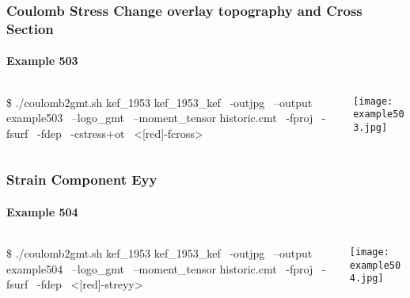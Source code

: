 \begin{frame}[t,fragile]
  \frametitle{Coulomb Stress Change overlay topography and Cross Section}
  \framesubtitle{Example 503}
  \label{ch5fr:ex503}
\begin{columns}[t]
  \begin{column}{.5\textwidth}
\begin{scriptsize}
\begin{verbnobox}[\vbdelim]
\$ ./coulomb2gmt.sh kef_1953 kef_1953_kef \
                   -outjpg \ 
                   --output example503 \
                   --logo_gmt \
                   --moment_tensor historic.cmt \
                   -fproj \
                   -fsurf \
                   -fdep \
                   -cstress+ot \ 
                   <[red]-fcross>
\end{verbnobox}
\end{scriptsize}

  \end{column}
  \begin{column}{.5\textwidth}

\centering
  \texttt{[image: example503.jpg]}
  \end{column}
\end{columns}

\end{frame}
\note{}

\begin{frame}[t,fragile]
  \frametitle{Strain Component Eyy}
  \framesubtitle{Example 504}
  \label{ch5fr:ex504}
\begin{columns}[t]
  \begin{column}{.5\textwidth}
\begin{scriptsize}
\begin{verbnobox}[\vbdelim]
\$ ./coulomb2gmt.sh kef_1953 kef_1953_kef \
                   -outjpg \ 
                   --output example504 \
                   --logo_gmt \
                   --moment_tensor historic.cmt \
                   -fproj \
                   -fsurf \
                   -fdep \
                   <[red]-streyy>
\end{verbnobox}
\end{scriptsize}

  \end{column}
  \begin{column}{.5\textwidth}

\centering
  \texttt{[image: example504.jpg]}
  \end{column}
\end{columns}

\end{frame}
\note{}

